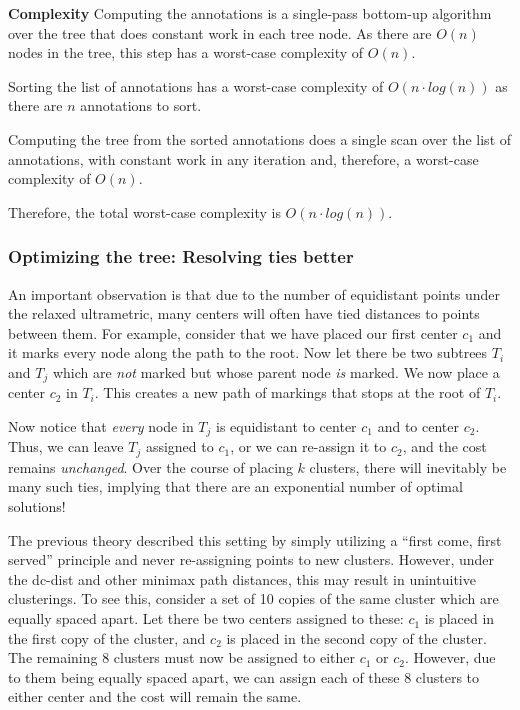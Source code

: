 \textbf{Complexity}
Computing the annotations is a single-pass bottom-up algorithm over the tree that does constant work in each tree node. As there are $O(n)$ nodes in the tree, this step has a worst-case complexity of $O(n)$.

Sorting the list of annotations has a worst-case complexity of $O(n \cdot log(n))$ as there are $n$ annotations to sort. 

Computing the tree from the sorted annotations does a single scan over the list of annotations, with constant work in any iteration and, therefore, a worst-case complexity of $O(n)$. 

Therefore, the total worst-case complexity is $O(n \cdot log(n))$.




\subsubsection{Optimizing the tree: Resolving ties better} \label{app:ties_heuristic}

An important observation is that due to the number of equidistant points under the relaxed ultrametric, many centers will often have tied distances to points between them. For example, consider that we have placed our first center $c_1$ and it marks every node along the path to the root. Now let there be two subtrees $T_i$ and $T_j$ which are \emph{not} marked but whose parent node \emph{is} marked. We now place a center $c_2$ in $T_i$. This creates a new path of markings that stops at the root of $T_i$.

Now notice that \emph{every} node in $T_j$ is equidistant to center $c_1$ and to center $c_2$. Thus, we can leave $T_j$ assigned to $c_1$, or we can re-assign it to $c_2$, and the cost remains \emph{unchanged}. Over the course of placing $k$ clusters, there will inevitably be many such ties, implying that there are an exponential number of optimal solutions!

The previous theory described this setting by simply utilizing a ``first come, first served'' principle and never re-assigning points to new clusters. However, under the dc-dist and other minimax path distances, this may result in unintuitive clusterings. To see this, consider a set of 10 copies of the same cluster which are equally spaced apart. Let there be two centers assigned to these: $c_1$ is placed in the first copy of the cluster, and $c_2$ is placed in the second copy of the cluster. The remaining 8 clusters must now be assigned to either $c_1$ or $c_2$. However, due to them being equally spaced apart, we can assign each of these 8 clusters to either center and the cost will remain the same.

